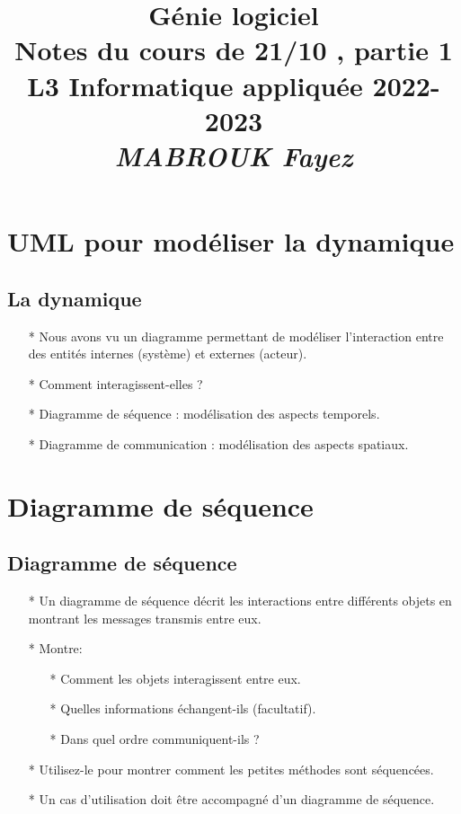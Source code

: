 \documentclass[12pt]{article}
\title{{\bf  Génie logiciel} \\
	Notes du cours de 21/10 , partie 1 \\
	{\small L3 Informatique appliquée 2022-2023} \\
	{\it \small MABROUK Fayez}}
\begin{document}
	\maketitle
	\newpage
	\section{UML pour modéliser la dynamique}
	\subsection{La dynamique}
	\begin{itemize}
		\item [*] Nous avons vu un diagramme permettant de modéliser l'interaction entre des entités internes (système) et externes (acteur).
		\item[*] Comment interagissent-elles ?
		\item [*]Diagramme de séquence : modélisation des aspects temporels.
		\item[*] Diagramme de communication : modélisation des aspects spatiaux.
	\end{itemize}
\section{Diagramme de séquence}
\subsection{Diagramme de séquence}
\begin{itemize}
	\item[*] Un diagramme de séquence décrit les interactions entre différents objets en
	montrant les messages transmis entre eux.
	\item[*] Montre:
	\begin{itemize}
		\item[*] Comment les objets interagissent entre eux.
		\item [*] Quelles informations échangent-ils (facultatif).
		\item [*] Dans quel ordre communiquent-ils ?
		
	\end{itemize}
\item[*] Utilisez-le pour montrer comment les petites méthodes sont séquencées.
\item[*] Un cas d'utilisation doit être accompagné d'un diagramme de séquence.
\end{itemize}
\end{document}
